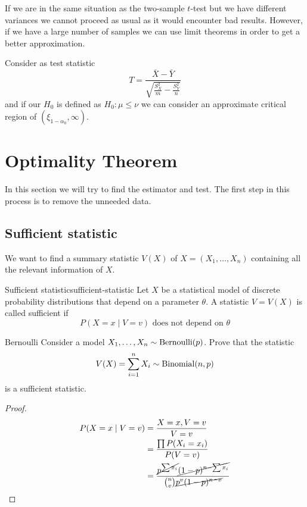 \documentclass[12pt]{extarticle}
\newcommand{\Bernoulli}{{\operatorfont Bernoulli}}
\newcommand{\Binomial}{{\operatorfont Binomial}}
\begin{document}
If we are in the same situation as the two-sample $t$-test but we have different variances
we cannot proceed as usual as it would encounter bad results.
However, if we have a large number of samples we can use limit theorems in order to get a better approximation.

Consider as test statistic
\begin{equation}
    T = \frac{\bar X - \bar Y}{\sqrt{\frac{S_X^2}{m} - \frac{S_Y^2}{n}}}
\end{equation}
and if our $H_0$ is defined as $H_0 : \mu \leq \nu$
we can consider an approximate critical region of $(\xi_{1-\alpha_0}, \infty)$.


\section{Optimality Theorem}

In this section we will try to find the  estimator and test.
The first step in this process is to remove the unneeded data.

\subsection{Sufficient statistic}

We want to find a summary statistic $V(X)$ of $X = (X_1, \dots, X_n)$ containing all the relevant information of $X$.

\begin{definition}{Sufficient statistic}{sufficient-statistic}
    Let $X$ be a statistical model of discrete probability distributions that depend on a parameter $\theta$.
    A statistic $V = V(X)$ is called sufficient if
    \begin{equation}
        P(X = x \mid V = v) \text{ does not depend on } \theta
    \end{equation}
\end{definition}

\begin{example}{Bernoulli}{}
    Consider a model $X_1, \dots, X_n \sim \Bernoulli(p)$.
    Prove that the statistic
    \begin{equation}
        V(X) = \sum_{i =1}^n X_i \sim \Binomial(n, p)
    \end{equation}
    is a sufficient statistic.
\end{example}

\begin{proof}
    \begin{align}
        P(X = x \mid V = v) & = \frac{X = x, V = v}{V = v}                                                                          \\
                            & = \frac{\prod P(X_i = x_i)}{P(V = v)}                                                                 \\
                            & = \frac{\cancel{p^{\sum x_i}} \cancel{(1-p)^{n - \sum x_i}}}{\binom{n}{v} \cancel{p^v (1-p)^{n - v}}}
    \end{align}
\end{proof}
\end{document}
